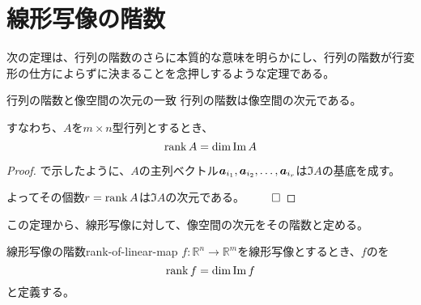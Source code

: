 \documentclass[../../../topic_linear-algebra]{subfiles}
\begin{document}
\sectionline
\section{線形写像の階数}

次の定理は、行列の階数のさらに本質的な意味を明らかにし、行列の階数が行変形の仕方によらずに決まることを念押しするような定理である。

\begin{theorem*}{行列の階数と像空間の次元の一致}
  行列の階数は像空間の次元である。

  すなわち、$A$を$m \times n$型行列とするとき、
  \begin{equation*}
    \rank A = \dim \Im A
  \end{equation*}
\end{theorem*}

\begin{proof}
  で示したように、$A$の主列ベクトル$\vb*{a}_{i_1}, \vb*{a}_{i_2}, \dots, \vb*{a}_{i_r}$は$\Im A$の基底を成す。

  よってその個数$r = \rank A$は$\Im A$の次元である。 $\qed$
\end{proof}

\br

この定理から、線形写像に対して、像空間の次元をその階数と定める。

\begin{definition}{線形写像の階数}{rank-of-linear-map}
  $f\colon \mathbb{R}^n \to \mathbb{R}^m$を線形写像とするとき、$f$のを
  \begin{equation*}
    \rank f = \dim \Im f
  \end{equation*}
  と定義する。
\end{definition}
\end{document}
